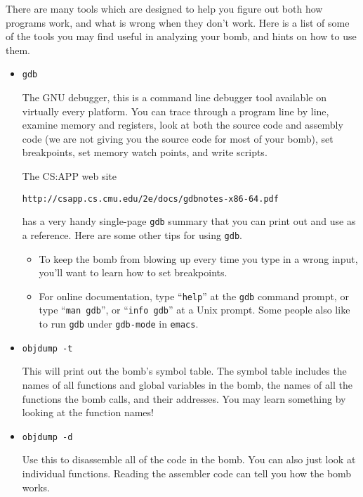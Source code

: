 \documentclass[11pt]{article}
\begin{document}
There are many tools which are designed to help you figure out both
how programs work, and what is wrong when they don't work.  Here is a
list of some of the tools you may find useful in analyzing your bomb,
and hints on how to use them.

\begin{itemize}

\item {\tt gdb }

The GNU debugger, this is a command line debugger tool available on
virtually every platform.  You can trace through a program line by
line, examine memory and registers, look at both the source code and
assembly code (we are not giving you the source code for most of your
bomb), set breakpoints, set memory watch points, and write scripts.

The CS:APP web site 
\begin{verbatim}
http://csapp.cs.cmu.edu/2e/docs/gdbnotes-x86-64.pdf
\end{verbatim}
has a very handy single-page {\tt gdb} summary that you can print out
and use as a reference. Here are some other tips for using {\tt gdb}.
\begin{itemize}

\item To keep the bomb from blowing up every time you type in a wrong
input, you'll want to learn how to set breakpoints.

\item For online documentation, type ``{\tt help}'' at the {\tt gdb} 
command prompt, 
or type ``{\tt man gdb}'', or ``{\tt info gdb}'' at a Unix prompt.  
Some people also
like to run {\tt gdb} under {\tt gdb-mode} in {\tt emacs}.
\end{itemize}

\item \texttt{objdump -t}

This will print out the bomb's symbol table. The symbol table includes the
names of all functions and global variables in the bomb, the names of
all the functions the bomb calls, and their addresses.  You may learn
something by looking at the function names!

\item \texttt{objdump -d}

Use this to disassemble all of the code in the bomb.  You can also
just look at individual functions.  Reading the assembler code can
tell you how the bomb works. 




\end{itemize}
\end{document}
